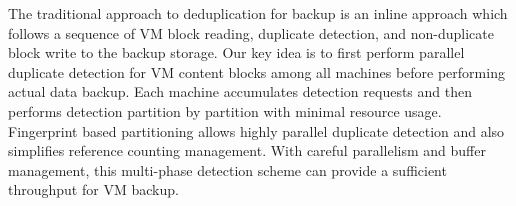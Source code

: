 The traditional approach to  deduplication for backup is an inline approach which follows
a sequence of VM block reading, duplicate detection,  and non-duplicate  block write to the 
backup storage.  
Our key idea  is to  first perform parallel duplicate detection for VM content blocks 
among all machines before performing actual data backup. Each machine
accumulates detection requests and  then performs detection   partition by partition 
with minimal resource usage.
Fingerprint based partitioning allows highly parallel duplicate detection  and also simplifies 
reference counting management.  
With careful parallelism and buffer  management,
this multi-phase detection scheme can provide  a sufficient throughput for VM backup.   












